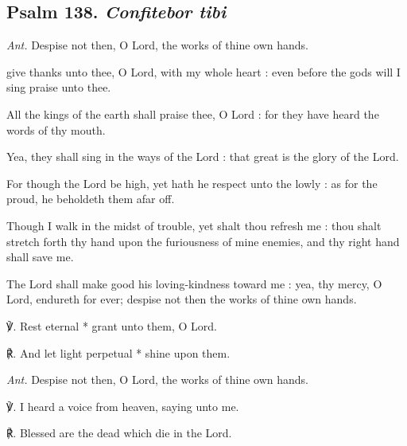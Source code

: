 \subsection{Psalm 138. \textit{Confitebor tibi}}\noindent
\textit{Ant.} Despise not then, {\dag} O Lord, the works of thine own hands.\par
{} give thanks unto thee, O Lord, with my whole heart : even before the gods will I sing praise unto thee.\par
{}
All the kings of the earth shall praise thee, O Lord : for they have heard the words of thy mouth.\par
{}Yea, they shall sing in the ways of the Lord : that great is the glory of the Lord.\par
{}For though the Lord be high, yet hath he respect unto the lowly : as for the proud, he beholdeth them afar off.\par
{}Though I walk in the midst of trouble, yet shalt thou refresh me : thou shalt stretch forth thy hand upon the furiousness of mine enemies, and thy right hand shall save me.\par
{}The Lord shall make good his loving-kindness toward me : yea, thy mercy, O Lord, endureth for ever; despise not then the works of thine own hands.
\par
℣. Rest eternal * grant unto them, O Lord.\par
℟. And let light perpetual * shine upon them.\par\noindent
\textit{Ant.} Despise not then, O Lord, the works of thine own hands.\par
\vspace{0.5\baselineskip}
℣. I heard a voice from heaven, saying unto me.\par 
℟. Blessed are the dead which die in the Lord.\par
